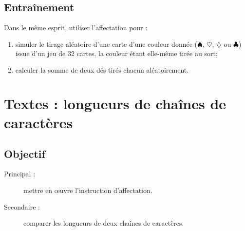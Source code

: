 \subsection{Entraînement}\label{affectation:jeux:entrainement}
Dans le même esprit, utiliser l'affectation pour :
\begin{enumerate}
\item simuler le tirage aléatoire d'une carte d'une couleur donnée 
	($\spadesuit$, $\heartsuit$, $\diamondsuit$ ou $\clubsuit$) issue 
	d'un jeu de 32 cartes, la couleur étant elle-même tirée au sort;
\item calculer la somme de deux dés tirés chacun aléatoirement.
\end{enumerate}

\section{Textes : longueurs de chaînes de caractères}

\subsection{Objectif}\label{affectation:textes:objectif}
\begin{description}
\item[Principal : ] mettre en \oe uvre l'instruction d'affectation.
\item[Secondaire :] comparer les longueurs de deux chaînes de caractères.
\end{description}

